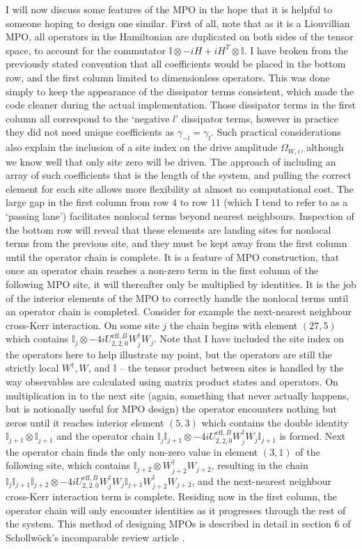 I will now discuss some features of the MPO in the hope that it is helpful to someone hoping to design one similar. First of all, note that as it is a Liouvillian MPO, all operators in the Hamiltonian are duplicated on both sides of the tensor space, to account for the commutator \(\mathbb{I} \otimes -iH + iH^{T} \otimes \mathbb{I}\). I have broken from the previously stated convention that all coefficients would be placed in the bottom row, and the first column limited to dimensionless operators. This was done simply to keep the appearance of the dissipator terms consistent, which made the code cleaner during the actual implementation. Those dissipator terms in the first column all correspond to the `negative \(l\)' dissipator terms, however in practice they did not need unique coefficients as \(\gamma_{-l} = \gamma_{l}\). Such practical considerations also explain the inclusion of a site index on the drive amplitude \(\Omega_{W,i}\), although we know well that only site zero will be driven. The approach of including an array of such coefficients that is the length of the system, and pulling the correct element for each site allows more flexibility at almost no computational cost. The large gap in the first column from row 4 to row 11 (which I tend to refer to as a `passing lane') facilitates nonlocal terms beyond nearest neighbours. Inspection of the bottom row will reveal that these elements are landing sites for nonlocal terms from the previous site, and they must be kept away from the first column until the operator chain is complete. It is a feature of MPO construction, that once an operator chain reaches a non-zero term in the first column of the following MPO site, it will thereafter only be multiplied by identities. It is the job of the interior elements of the MPO to correctly handle the nonlocal terms until an operator chain is completed. Consider for example the next-nearest neighbour cross-Kerr interaction. On some site \(j\) the chain begins with element \((27,5)\) which contains \(\mathbb{I}_{j} \otimes -4iU^{\mathrm{eff},B}_{2,2,0}W_{j}^{\dagger}W_{j}\). Note that I have included the site index on the operators here to help illustrate my point, but the operators are still the strictly local \(W^{\dagger}, W\), and \(\mathbb{I}\) -- the tensor product between sites is handled by the way observables are calculated using matrix product states and operators. On multiplication in to the next site (again, something that never actually happens, but is notionally useful for MPO design) the operator encounters nothing but zeros until it reaches interior element \((5,3)\) which contains the double identity \(\mathbb{I}_{j+1} \otimes \mathbb{I}_{j+1}\) and the operator chain \(\mathbb{I}_{j}\mathbb{I}_{j+1} \otimes -4iU^{\mathrm{eff},B}_{2,2,0}W_{j}^{\dagger}W_{j}\mathbb{I}_{j+1}\) is formed. Next the operator chain finds the only non-zero value in element \((3,1)\) of the following site, which contains \(\mathbb{I}_{j+2} \otimes W_{j+2}^{\dagger}W_{j+2}\), resulting in the chain \(\mathbb{I}_{j}\mathbb{I}_{j+1}\mathbb{I}_{j+2} \otimes -4iU^{\mathrm{eff},B}_{2,2,0}W_{j}^{\dagger}W_{j}\mathbb{I}_{j+1}W_{j+2}^{\dagger}W_{j+2}\), and the next-nearest neighbour cross-Kerr interaction term is complete. Residing now in the first column, the operator chain will only encounter identities as it progresses through the rest of the system. This method of designing MPOs is described in detail in section 6 of Schollw\"{o}ck's incomparable review article \cite{Schollwock2011}.